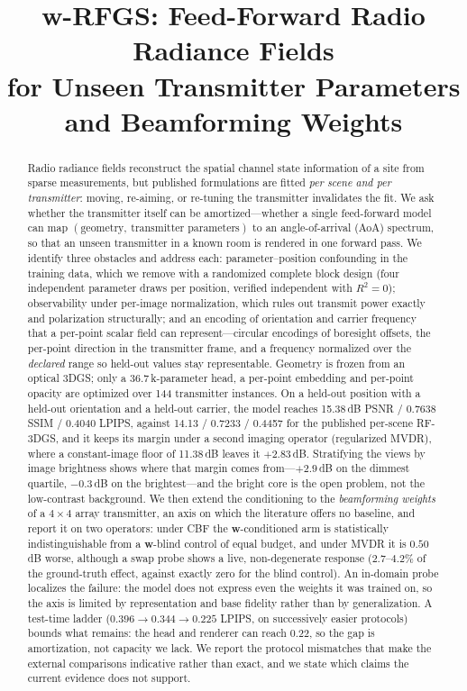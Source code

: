 \documentclass[conference]{IEEEtran}
\title{w-RFGS: Feed-Forward Radio Radiance Fields\\
for Unseen Transmitter Parameters and Beamforming Weights}
\author{%
\IEEEauthorblockN{Author Names To Be Completed}
\IEEEauthorblockA{Affiliation to be completed\\
Email: to be completed}
}
\begin{document}
\maketitle

\begin{abstract}
Radio radiance fields reconstruct the spatial channel state information of a
site from sparse measurements, but published formulations are fitted
\emph{per scene and per transmitter}: moving, re-aiming, or re-tuning the
transmitter invalidates the fit. We ask whether the transmitter itself can be
amortized---whether a single feed-forward model can map
$(\text{geometry},\ \text{transmitter parameters})$ to an angle-of-arrival
(AoA) spectrum, so that an unseen transmitter in a known room is rendered in
one forward pass. We identify three obstacles and address each: parameter--position
confounding in the training data, which we remove with a randomized complete
block design (four independent parameter draws per position, verified
independent with $R^2=0$); observability under per-image normalization, which
rules out transmit power exactly and polarization structurally; and an encoding
of orientation and carrier frequency that a per-point scalar field can
represent---circular encodings of boresight offsets, the per-point direction in
the transmitter frame, and a frequency normalized over the \emph{declared}
range so held-out values stay representable. Geometry is frozen from an optical
3DGS; only a 36.7\,k-parameter head, a per-point embedding and per-point opacity
are optimized over 144 transmitter instances. On a held-out position with a
held-out orientation and a held-out carrier, the model reaches
15.38\,dB PSNR / 0.7638 SSIM / 0.4040 LPIPS, against 14.13 / 0.7233 / 0.4457
for the published per-scene RF-3DGS, and it keeps its margin under a second
imaging operator (regularized MVDR), where a constant-image floor of
11.38\,dB leaves it $+2.83$\,dB. Stratifying the views by image brightness
shows where that margin comes from---$+2.9$\,dB on the dimmest quartile,
$-0.3$\,dB on the brightest---and the bright core is the open problem, not the
low-contrast background. We then extend the conditioning to the
\emph{beamforming weights} of a $4\times4$ array transmitter, an axis on which
the literature offers no baseline, and report it on two operators: under CBF the
$\mathbf{w}$-conditioned arm is statistically indistinguishable from a
$\mathbf{w}$-blind control of equal budget, and under MVDR it is $0.50$\,dB
worse, although a swap probe shows a live, non-degenerate response
($2.7$--$4.2\%$ of the ground-truth effect, against exactly zero for the blind
control). An in-domain probe localizes the failure: the model does not express
even the weights it was trained on, so the axis is limited by representation
and base fidelity rather than by generalization. A test-time ladder
($0.396\rightarrow0.344\rightarrow0.225$ LPIPS, on successively easier
protocols) bounds what remains: the head and renderer can reach $0.22$, so the
gap is amortization, not capacity we lack. We report the protocol mismatches that make the external comparisons
indicative rather than exact, and we state which claims the current evidence
does not support.
\end{abstract}
\end{document}
